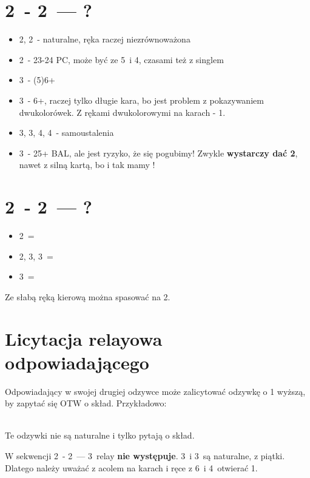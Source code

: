 \documentclass[12pt, a4paper]{article}
\begin{document}
\pagebreak
\section{2\clubs\ - 2\diams\ --- ?}
\begin{itemize}
    \item 2\hearts, 2\spades\ - naturalne, ręka raczej niezrównoważona
    \item 2\nt\ - 23-24 PC, może być ze 5\major\ i 4\minor, czasami też z singlem
    \item 3\clubs\ - (5)6+\clubs
    \item 3\diams\ - 6+\diams, raczej tylko długie kara, bo jest problem z pokazywaniem dwukolorówek. 
    Z rękami dwukolorowymi na karach - 1\diams.
    \item 3\hearts, 3\spades, 4\clubs, 4\diams\ - samoustalenia
    \item 3\nt\ - 25+ BAL, ale jest ryzyko, że się pogubimy! Zwykle \textbf{wystarczy dać 2\ntx}, 
    nawet z silną kartą, bo i tak mamy \gf!
\end{itemize}

\section{2\clubs\ - 2\hearts\ --- ?}
\begin{itemize}
    \item 2\spades\ = \fonce
    \item 2\nt, 3\clubs, 3\diams\ = \nf
    \item 3\hearts\ = \gf
\end{itemize}
Ze słabą ręką kierową można spasować na 2\hearts.

\section{Licytacja relayowa odpowiadającego}
\raggedright
Odpowiadający w swojej drugiej odzywce może zalicytować odzywkę o 1 wyższą, by zapytać się OTW o skład.
Przykładowo: \\[1em]
\webidding{
    2\clubs & 2\diams \\
    2\hearts & \conventional{2\spades}
}
\webidding{
    2\clubs & 2\diams \\
    2\spades & \conventional{2\ntx}
} \\[1em]
\raggedright
Te odzywki nie są naturalne i tylko pytają o skład.

\begin{formal}
    W sekwencji 2\clubs\ - 2\diams\ --- 3\diams\ relay \textbf{nie występuje}. 3\hearts\ i 3\spades\ są naturalne,
    z piątki. Dlatego należy uważać z acolem na karach i ręce z 6\diams\ i 4\major\ otwierać 1\diams.
\end{formal}
\end{document}
